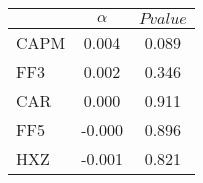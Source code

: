 \begin{tabular}{lcc}
\toprule
 & $\alpha$ & $Pvalue$ \\
\midrule
CAPM & 0.004 & 0.089 \\
FF3 & 0.002 & 0.346 \\
CAR & 0.000 & 0.911 \\
FF5 & -0.000 & 0.896 \\
HXZ & -0.001 & 0.821 \\
\bottomrule
\end{tabular}
